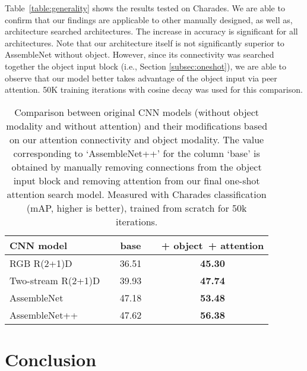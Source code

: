 \documentclass[runningheads]{llncs}
\begin{document}
Table~\ref{table:generality} shows the results tested on Charades. We are able to confirm that our findings are applicable to other manually designed, as well as, architecture searched architectures. The increase in accuracy is significant for all architectures. Note that our architecture itself is not significantly superior to AssembleNet without object.  However, since its connectivity was searched together the object input block (i.e., Section \ref{subsec:oneshot}), we are able to observe that our model better takes advantage of the object input via peer attention.
50K training iterations with cosine decay was used for this comparison.



\begin{table}
\setlength\tabcolsep{5pt}
\caption{Comparison between original CNN models (without object modality and without attention) and their modifications based on our attention connectivity and object modality. The value corresponding to `AssembleNet++' for the column `base' is obtained by manually removing connections from the object input block and removing attention from our final one-shot attention search model. Measured with Charades classification (mAP, higher is better), trained from scratch for 50k iterations.}
\label{table:generality}
\begin{center}
\begin{tabular}{l|c|c}
\hline
CNN model~ &  ~~base~~  & + object~+ attention \\ 
\hline
RGB R(2+1)D &  36.51  & \textbf{45.30} \\  
Two-stream R(2+1)D &  39.93  & \textbf{47.74} \\   
AssembleNet &  47.18  & \textbf{53.48} \\  
AssembleNet++  &  47.62  & \textbf{56.38} \\
\hline
\end{tabular}
\label{tab:generality}
\end{center}
\end{table}


\section{Conclusion}
\end{document}
